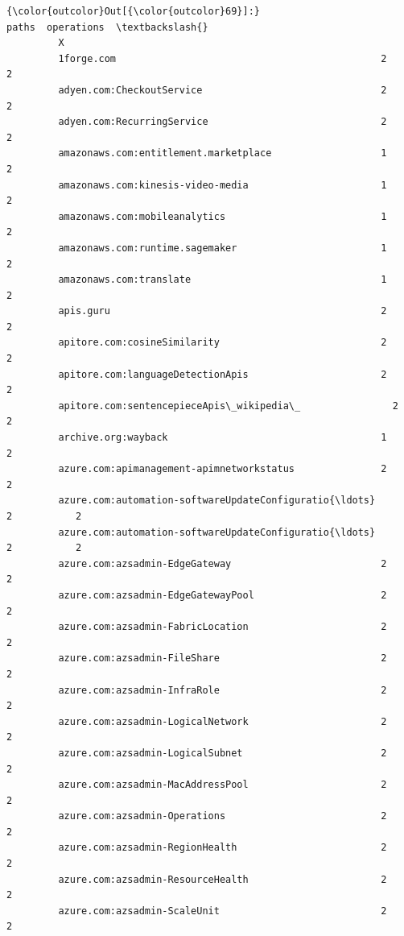 \documentclass[11pt]{article}
\begin{document}
\begin{Verbatim}[commandchars=\\\{\}]
{\color{outcolor}Out[{\color{outcolor}69}]:}                                                     paths  operations  \textbackslash{}
         X                                                                       
         1forge.com                                              2           2   
         adyen.com:CheckoutService                               2           2   
         adyen.com:RecurringService                              2           2   
         amazonaws.com:entitlement.marketplace                   1           2   
         amazonaws.com:kinesis-video-media                       1           2   
         amazonaws.com:mobileanalytics                           1           2   
         amazonaws.com:runtime.sagemaker                         1           2   
         amazonaws.com:translate                                 1           2   
         apis.guru                                               2           2   
         apitore.com:cosineSimilarity                            2           2   
         apitore.com:languageDetectionApis                       2           2   
         apitore.com:sentencepieceApis\_wikipedia\_                2           2   
         archive.org:wayback                                     1           2   
         azure.com:apimanagement-apimnetworkstatus               2           2   
         azure.com:automation-softwareUpdateConfiguratio{\ldots}      2           2   
         azure.com:automation-softwareUpdateConfiguratio{\ldots}      2           2   
         azure.com:azsadmin-EdgeGateway                          2           2   
         azure.com:azsadmin-EdgeGatewayPool                      2           2   
         azure.com:azsadmin-FabricLocation                       2           2   
         azure.com:azsadmin-FileShare                            2           2   
         azure.com:azsadmin-InfraRole                            2           2   
         azure.com:azsadmin-LogicalNetwork                       2           2   
         azure.com:azsadmin-LogicalSubnet                        2           2   
         azure.com:azsadmin-MacAddressPool                       2           2   
         azure.com:azsadmin-Operations                           2           2   
         azure.com:azsadmin-RegionHealth                         2           2   
         azure.com:azsadmin-ResourceHealth                       2           2   
         azure.com:azsadmin-ScaleUnit                            2           2   

\end{Verbatim}
\end{document}
